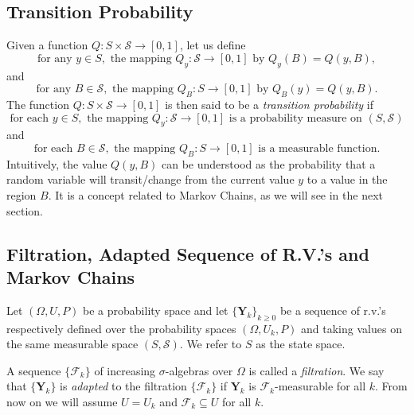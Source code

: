 \subsection{Transition Probability}

Given a function $Q:S\times\mathcal{S}\rightarrow [0,1]$, let us define
\begin{equation*}
\mbox{for any }y\in S,\mbox{ the mapping }Q_y:\mathcal{S}\rightarrow [0,1]\mbox{ by }Q_y(B)=Q(y,B),
\end{equation*}
and
\begin{equation*}
\mbox{for any }B\in\mathcal{S},\mbox{ the mapping }Q_B:S\rightarrow [0,1]\mbox{ by }Q_B(y)=Q(y,B).
\end{equation*}
The function $Q:S\times\mathcal{S}\rightarrow [0,1]$ is then said to be a {\it transition probability} if
\begin{equation*}
\mbox{for each }y\in S,\mbox{ the mapping }Q_y:\mathcal{S}\rightarrow [0,1]\mbox{ is a probability measure on }(S,\mathcal{S})
\end{equation*}
and
\begin{equation*}
\mbox{for each }B\in\mathcal{S},\mbox{ the mapping }Q_B:S\rightarrow [0,1]\mbox{ is a measurable function}.
\end{equation*}
Intuitively, the value $Q(y,B)$ can be understood as
the probability that a random variable will transit/change from the current value $y$ to a value in the region $B$.
It is a concept related to Markov Chains, as we will see in the next section.

\subsection{Filtration, Adapted Sequence of R.V.'s and Markov Chains}

Let $(\Omega,U,P)$ be a probability space and
let $\{\mathbf{Y}_k\}_{k\geqslant 0}$ be a sequence of r.v.'s
respectively defined over the probability spaces $(\Omega,U_k,P)$ and
taking values on the same measurable space $(S,\mathcal{S})$.
We refer to $S$ as the state space.

A sequence $\{\mathcal{F}_k\}$ of increasing $\sigma$-algebras over $\Omega$ is called a {\it filtration}.
We say that $\{\mathbf{Y}_k\}$ is {\it adapted} to the filtration $\{\mathcal{F}_k\}$ if $\mathbf{Y}_k$ is $\mathcal{F}_k$-measurable for all $k$.
From now on we will assume $U=U_k$ and $\mathcal{F}_k\subseteq U$ for all $k$.


